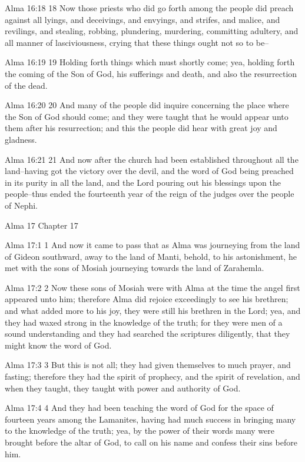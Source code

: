Alma 16:18
 18 Now those priests who did go forth among the people did
preach against all lyings, and deceivings, and envyings, and
strifes, and malice, and revilings, and stealing, robbing,
plundering, murdering, committing adultery, and all manner of
lasciviousness, crying that these things ought not so to be--

Alma 16:19
 19 Holding forth things which must shortly come; yea, holding
forth the coming of the Son of God, his sufferings and death, and
also the resurrection of the dead.

Alma 16:20
 20 And many of the people did inquire concerning the place where
the Son of God should come; and they were taught that he would
appear unto them after his resurrection; and this the people did
hear with great joy and gladness.

Alma 16:21
 21 And now after the church had been established throughout all
the land--having got the victory over the devil, and the word of
God being preached in its purity in all the land, and the Lord
pouring out his blessings upon the people--thus ended the
fourteenth year of the reign of the judges over the people of
Nephi.

Alma 17
Chapter 17

Alma 17:1
 1 And now it came to pass that as Alma was journeying from the
land of Gideon southward, away to the land of Manti, behold, to
his astonishment, he met with the sons of Mosiah journeying
towards the land of Zarahemla.

Alma 17:2
 2 Now these sons of Mosiah were with Alma at the time the angel
first appeared unto him; therefore Alma did rejoice exceedingly
to see his brethren; and what added more to his joy, they were
still his brethren in the Lord; yea, and they had waxed strong in
the knowledge of the truth; for they were men of a sound
understanding and they had searched the scriptures diligently,
that they might know the word of God.

Alma 17:3
 3 But this is not all; they had given themselves to much prayer,
and fasting; therefore they had the spirit of prophecy, and the
spirit of revelation, and when they taught, they taught with
power and authority of God.

Alma 17:4
 4 And they had been teaching the word of God for the space of
fourteen years among the Lamanites, having had much success in
bringing many to the knowledge of the truth; yea, by the power of
their words many were brought before the altar of God, to call on
his name and confess their sins before him.

